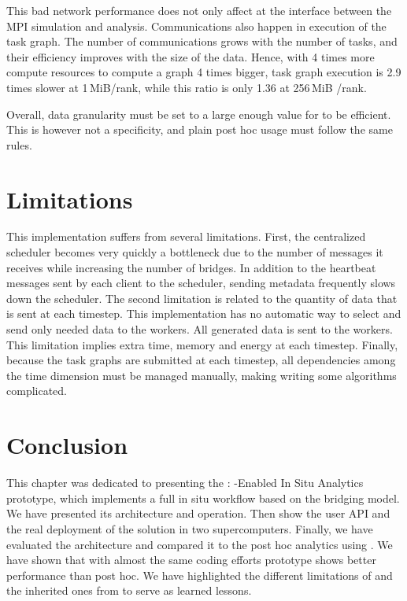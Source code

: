 This bad network performance does not only affect \deisa at the interface between the MPI simulation and \dask analysis.
Communications also happen in \dask execution of the task graph.
The number of communications grows with the number of tasks, and their efficiency improves with the size of the data.
Hence, with 4 times more compute resources to compute a graph 4 times bigger, \dask task graph execution is 2.9 times slower at 1\,MiB/rank, while this ratio is only 1.36 at 256\,MiB /rank.

Overall, data granularity must be set to a large enough value for \deisa to be efficient.
This is however not a \deisa specificity, and plain \dask post hoc usage must follow the same rules.

\section{Limitations}
This implementation suffers from several limitations. First, the centralized scheduler becomes very quickly a bottleneck due to the number of messages it receives while increasing the number of bridges. In addition to the heartbeat messages sent by each client to the scheduler, sending metadata frequently slows down the scheduler. The second limitation is related to the quantity of data that is sent at each timestep. This implementation has no automatic way to select and send only needed data to the workers. All generated data is sent to the workers. This limitation implies extra time, memory and energy at each timestep. 
Finally, because the task graphs are submitted at each timestep, all dependencies among the time dimension must be managed manually, making writing some algorithms complicated.  


\section{Conclusion}
This chapter was dedicated to presenting the \deisa : \dask-Enabled In Situ Analytics prototype, which implements a full in situ workflow based on the \deisa bridging model.
We have presented its architecture and operation. Then show the user API and the real deployment of the solution in two supercomputers. Finally, we have evaluated the \deisa architecture and compared it to the post hoc analytics using \dask. 
We have shown that with almost the same coding efforts \deisa prototype shows better performance than post hoc. We have highlighted the different limitations of \deisa and the inherited ones from \dask to serve as learned lessons.



